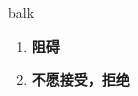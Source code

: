
\begin{frame}
{\huge balk}
\begin{center}
\begin{enumerate}\Large
  \item \textbf{阻碍}
  \item \textbf{不愿接受，拒绝}
\end{enumerate}
\end{center}
\end{frame}
